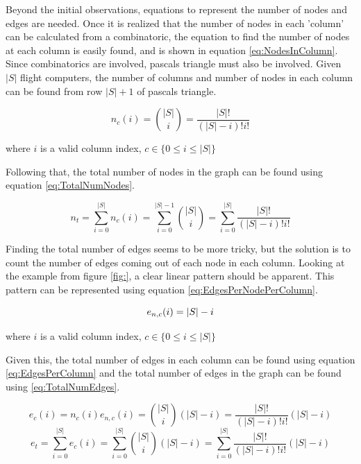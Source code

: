 \documentclass{article}
\begin{document}
Beyond the initial observations, equations to represent the number of nodes and edges are needed. Once it is realized that the number of nodes in each 'column' can be calculated from a combinatoric, the equation to find the number of nodes at each column is easily found, and is shown in equation \ref{eq:NodesInColumn}. Since combinatorics are involved, pascals triangle must also be involved. Given $|S|$ flight computers, the number of columns and number of nodes in each column can be found from row $|S|+1$ of pascals triangle.

\begin{equation}
    n_c(i)=\binom{|S|}{i}=\frac{|S|!}{(|S|-i)!i!}
    \label{eq:NodesInColumn}
\end{equation}
\centerline{where $i$ is a valid column index, $c\in \{ 0\le i\le |S|\}$}

Following that, the total number of nodes in the graph can be found using equation \ref{eq:TotalNumNodes}.

\begin{equation}
    n_t=\sum_{i=0}^{|S|}n_c(i)=\sum_{i=0}^{|S|-1}\binom{|S|}{i}=\sum_{i=0}^{|S|}\frac{|S|!}{(|S|-i)!i!}
    \label{eq:TotalNumNodes}
\end{equation}

Finding the total number of edges seems to be more tricky, but the solution is to count the number of edges coming out of each node in each column. Looking at the example from figure \ref{fig:}, a clear linear pattern should be apparent. This pattern can be represented using equation \ref{eq:EdgesPerNodePerColumn}.

\begin{equation}
    e_{n,c}(i)=|S|-i\\
    \label{eq:EdgesPerNodePerColumn}
\end{equation}
\centerline{where $i$ is a valid column index, $c\in \{ 0\le i\le |S|\}$}

Given this, the total number of edges in each column can be found using equation \ref{eq:EdgesPerColumn} and the total number of edges in the graph can be found using \ref{eq:TotalNumEdges}.

\begin{equation}
    e_c(i)=n_c(i)e_{n,c}(i)=\binom{|S|}{i}\left(|S|-i\right)=
    \frac{|S|!}{(|S|-i)!i!}\left(|S|-i\right)
    \label{eq:EdgesPerColumn}
\end{equation}
\begin{equation}
    e_t=\sum_{i=0}^{|S|}e_c(i)=
    \sum_{i=0}^{|S|}\binom{|S|}{i}\left(|S|-i\right)=
    \sum_{i=0}^{|S|}\frac{|S|!}{(|S|-i)!i!}\left(|S|-i\right)
    \label{eq:TotalNumEdges}
\end{equation}
\end{document}
